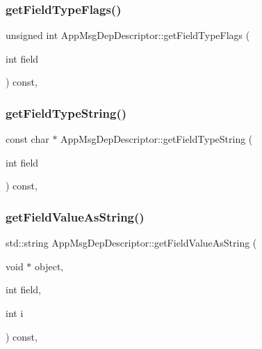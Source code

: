 \subsubsection{\texorpdfstring{get\+Field\+Type\+Flags()}{getFieldTypeFlags()}}
{\footnotesize\ttfamily unsigned int App\+Msg\+Dep\+Descriptor\+::get\+Field\+Type\+Flags (\begin{DoxyParamCaption}\item[{int}]{field }\end{DoxyParamCaption}) const\hspace{0.3cm}{\ttfamily [override]}, {\ttfamily [virtual]}}

\mbox{\label{classAppMsgDepDescriptor_a376972c07aabb5b32e12a38649a56aaf}} 
\subsubsection{\texorpdfstring{get\+Field\+Type\+String()}{getFieldTypeString()}}
{\footnotesize\ttfamily const char $\ast$ App\+Msg\+Dep\+Descriptor\+::get\+Field\+Type\+String (\begin{DoxyParamCaption}\item[{int}]{field }\end{DoxyParamCaption}) const\hspace{0.3cm}{\ttfamily [override]}, {\ttfamily [virtual]}}

\mbox{\label{classAppMsgDepDescriptor_a83fabb429ce26b55eed23aebe202570d}} 
\subsubsection{\texorpdfstring{get\+Field\+Value\+As\+String()}{getFieldValueAsString()}}
{\footnotesize\ttfamily std\+::string App\+Msg\+Dep\+Descriptor\+::get\+Field\+Value\+As\+String (\begin{DoxyParamCaption}\item[{void $\ast$}]{object,  }\item[{int}]{field,  }\item[{int}]{i }\end{DoxyParamCaption}) const\hspace{0.3cm}{\ttfamily [override]}, {\ttfamily [virtual]}}

